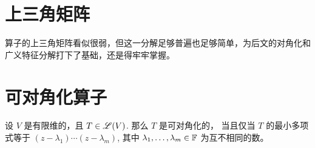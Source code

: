 \section{上三角矩阵}
算子的上三角矩阵看似很弱，但这一分解足够普遍也足够简单，为后文的对角化和广义特征分解打下了基础，还是得牢牢掌握。
\section{可对角化算子}

\begin{theorem}
    设 \(V\) 是有限维的，且 \(T \in \mathscr{L}(V)\). 那么 \(T\) 是可对角化的，
    当且仅当 \(T\) 的最小多项式等于 \((z - \lambda_1) \cdots (z - \lambda_m)\), 其中 \(\lambda_1, \ldots, \lambda_m \in \mathbb{F}\) 为互不相同的数。
\end{theorem}

